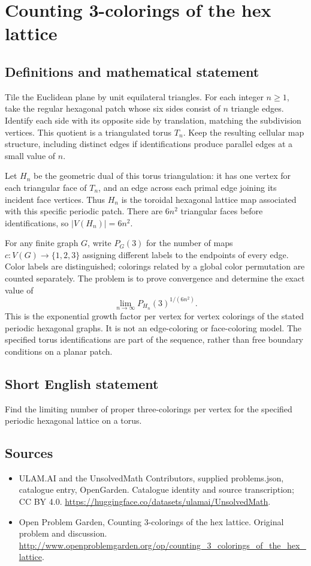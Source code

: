 \documentclass[11pt,a4paper]{article}
\begin{document}
\section*{Counting 3-colorings of the hex lattice}\label{statement}

\subsection{Definitions and mathematical statement}
Tile the Euclidean plane by unit equilateral triangles. For each integer $n\ge1$, take the regular hexagonal patch whose six sides consist of $n$ triangle edges. Identify each side with its opposite side by translation, matching the subdivision vertices. This quotient is a triangulated torus $T_n$. Keep the resulting cellular map structure, including distinct edges if identifications produce parallel edges at a small value of $n$.

Let $H_n$ be the geometric dual of this torus triangulation: it has one vertex for each triangular face of $T_n$, and an edge across each primal edge joining its incident face vertices. Thus $H_n$ is the toroidal hexagonal lattice map associated with this specific periodic patch. There are $6n^2$ triangular faces before identifications, so $|V(H_n)|=6n^2$.

For any finite graph $G$, write $P_G(3)$ for the number of maps $c:V(G)\to\{1,2,3\}$ assigning different labels to the endpoints of every edge. Color labels are distinguished; colorings related by a global color permutation are counted separately. The problem is to prove convergence and determine the exact value of
\[
                \lim_{n\to\infty}P_{H_n}(3)^{1/(6n^2)}.
\]
This is the exponential growth factor per vertex for vertex colorings of the stated periodic hexagonal graphs. It is not an edge-coloring or face-coloring model. The specified torus identifications are part of the sequence, rather than free boundary conditions on a planar patch.
\subsection{Short English statement}
Find the limiting number of proper three-colorings per vertex for the specified periodic hexagonal lattice on a torus.
\subsection{Sources}
\begin{itemize}
\item[S1] ULAM.AI and the UnsolvedMath Contributors, supplied problems.json, catalogue entry, OpenGarden. Catalogue identity and source transcription; CC BY 4.0.
\url{https://huggingface.co/datasets/ulamai/UnsolvedMath}.
\item[S2] Open Problem Garden, Counting 3-colorings of the hex lattice. Original problem and discussion.
\url{http://www.openproblemgarden.org/op/counting_3_colorings_of_the_hex_lattice}.
\end{itemize}
\end{document}
